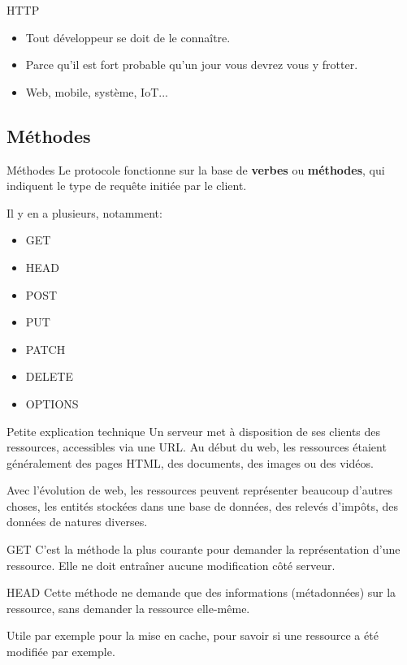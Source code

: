 \documentclass{beamer}
\begin{document}
\begin{frame}{HTTP}
\begin{itemize}
  \item Tout développeur se doit de le connaître.
  \pause
  \item Parce qu'il est fort probable qu'un jour vous devrez vous y frotter.
  \pause
  \item Web, mobile, système, IoT...
\end{itemize}
\end{frame}

\subsection{Méthodes}
\begin{frame}{Méthodes}
Le protocole fonctionne sur la base de \textbf{verbes} ou \textbf{méthodes}, qui indiquent le type de requête initiée par le client.

\pause
Il y en a plusieurs, notamment:
\begin{itemize}
  \item GET
  \item HEAD
  \item POST
  \item PUT
  \item PATCH
  \item DELETE
  \item OPTIONS
\end{itemize}
\end{frame}

\begin{frame}{Petite explication technique}
Un serveur met à disposition de ses clients des ressources, accessibles via une URL. Au début du web, les ressources étaient généralement des pages HTML, des documents, des images ou des vidéos.

Avec l'évolution de web, les ressources peuvent représenter beaucoup d'autres choses, les entités stockées dans une base de données, des relevés d'impôts, des données de natures diverses.
\end{frame}

\begin{frame}{GET}
C'est la méthode la plus courante pour demander la représentation d'une ressource. Elle ne doit entraîner aucune modification côté serveur.
\end{frame}

\begin{frame}{HEAD}
Cette méthode ne demande que des informations (métadonnées) sur la ressource, sans demander la ressource elle-même.

Utile par exemple pour la mise en cache, pour savoir si une ressource a été modifiée par exemple.
\end{frame}
\end{document}

